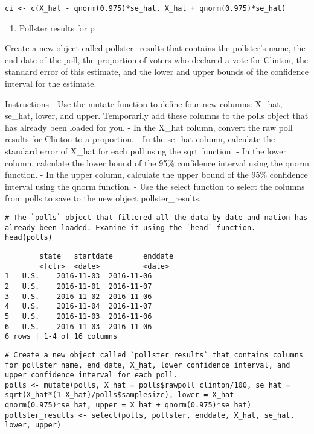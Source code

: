 \documentclass[
]{article}
\providecommand{\tightlist}{%
  \setlength{\itemsep}{0pt}\setlength{\parskip}{0pt}}
\begin{document}
\begin{verbatim}
ci <- c(X_hat - qnorm(0.975)*se_hat, X_hat + qnorm(0.975)*se_hat)
\end{verbatim}

\begin{enumerate}
\def\labelenumi{\arabic{enumi}.}
\setcounter{enumi}{1}
\tightlist
\item
  Pollster results for p
\end{enumerate}

Create a new object called pollster\_results that contains the
pollster's name, the end date of the poll, the proportion of voters who
declared a vote for Clinton, the standard error of this estimate, and
the lower and upper bounds of the confidence interval for the estimate.

Instructions - Use the mutate function to define four new columns:
X\_hat, se\_hat, lower, and upper. Temporarily add these columns to the
polls object that has already been loaded for you. - In the X\_hat
column, convert the raw poll results for Clinton to a proportion. - In
the se\_hat column, calculate the standard error of X\_hat for each poll
using the sqrt function. - In the lower column, calculate the lower
bound of the 95\% confidence interval using the qnorm function. - In the
upper column, calculate the upper bound of the 95\% confidence interval
using the qnorm function. - Use the select function to select the
columns from polls to save to the new object pollster\_results.

\begin{verbatim}
# The `polls` object that filtered all the data by date and nation has already been loaded. Examine it using the `head` function.
head(polls)
\end{verbatim}

\begin{verbatim}
        state   startdate       enddate
        <fctr>  <date>          <date>
1   U.S.    2016-11-03  2016-11-06  
2   U.S.    2016-11-01  2016-11-07  
3   U.S.    2016-11-02  2016-11-06  
4   U.S.    2016-11-04  2016-11-07  
5   U.S.    2016-11-03  2016-11-06  
6   U.S.    2016-11-03  2016-11-06  
6 rows | 1-4 of 16 columns
\end{verbatim}

\begin{verbatim}
# Create a new object called `pollster_results` that contains columns for pollster name, end date, X_hat, lower confidence interval, and upper confidence interval for each poll.
polls <- mutate(polls, X_hat = polls$rawpoll_clinton/100, se_hat = sqrt(X_hat*(1-X_hat)/polls$samplesize), lower = X_hat - qnorm(0.975)*se_hat, upper = X_hat + qnorm(0.975)*se_hat)
pollster_results <- select(polls, pollster, enddate, X_hat, se_hat, lower, upper)
\end{verbatim}
\end{document}
